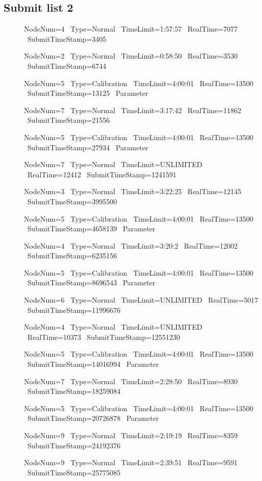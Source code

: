 \subsection{Submit list 2}
\begin{description}
    \item[] NodeNum=4 \ Type=Normal \ TimeLimit=1:57:57 \ RealTime=7077 \ SubmitTimeStamp=3405
\item[] NodeNum=2 \ Type=Normal \ TimeLimit=0:58:50 \ RealTime=3530 \ SubmitTimeStamp=6744
\item[] NodeNum=5 \ Type=Calibration \ TimeLimit=4:00:01 \ RealTime=13500 \ SubmitTimeStamp=13125 \ Parameter
\item[] NodeNum=7 \ Type=Normal \ TimeLimit=3:17:42 \ RealTime=11862 \ SubmitTimeStamp=21556
\item[] NodeNum=5 \ Type=Calibration \ TimeLimit=4:00:01 \ RealTime=13500 \ SubmitTimeStamp=27934 \ Parameter
\item[] NodeNum=7 \ Type=Normal \ TimeLimit=UNLIMITED \ RealTime=12412 \ SubmitTimeStamp=1241591
\item[] NodeNum=3 \ Type=Normal \ TimeLimit=3:22:25 \ RealTime=12145 \ SubmitTimeStamp=3995500
\item[] NodeNum=5 \ Type=Calibration \ TimeLimit=4:00:01 \ RealTime=13500 \ SubmitTimeStamp=4658139 \ Parameter
\item[] NodeNum=4 \ Type=Normal \ TimeLimit=3:20:2 \ RealTime=12002 \ SubmitTimeStamp=6235156
\item[] NodeNum=5 \ Type=Calibration \ TimeLimit=4:00:01 \ RealTime=13500 \ SubmitTimeStamp=8696543 \ Parameter
\item[] NodeNum=6 \ Type=Normal \ TimeLimit=UNLIMITED \ RealTime=5017 \ SubmitTimeStamp=11996676
\item[] NodeNum=4 \ Type=Normal \ TimeLimit=UNLIMITED \ RealTime=10373 \ SubmitTimeStamp=12551230
\item[] NodeNum=5 \ Type=Calibration \ TimeLimit=4:00:01 \ RealTime=13500 \ SubmitTimeStamp=14016994 \ Parameter
\item[] NodeNum=7 \ Type=Normal \ TimeLimit=2:28:50 \ RealTime=8930 \ SubmitTimeStamp=18259084
\item[] NodeNum=5 \ Type=Calibration \ TimeLimit=4:00:01 \ RealTime=13500 \ SubmitTimeStamp=20726878 \ Parameter
\item[] NodeNum=9 \ Type=Normal \ TimeLimit=2:19:19 \ RealTime=8359 \ SubmitTimeStamp=24192376
\item[] NodeNum=9 \ Type=Normal \ TimeLimit=2:39:51 \ RealTime=9591 \ SubmitTimeStamp=25775085

\end{description}
